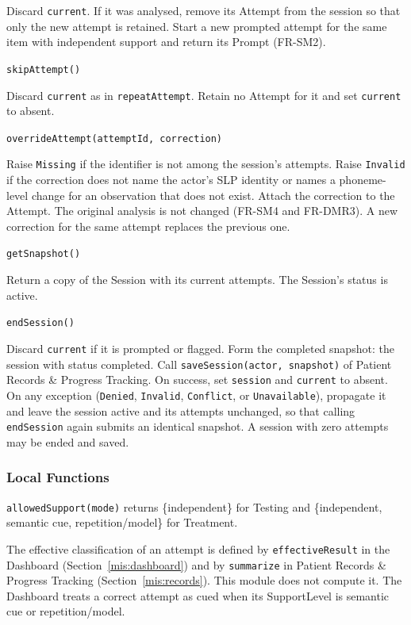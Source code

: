 \documentclass[12pt, titlepage]{article}
\begin{document}
\begin{description}
Discard \texttt{current}. If it was analysed, remove its Attempt from the
session so that only the new attempt is retained. Start a new prompted attempt
for the same item with independent support and return its Prompt (FR-SM2).
\item[] \texttt{skipAttempt()}\par
Discard \texttt{current} as in \texttt{repeatAttempt}. Retain no Attempt for it
and set \texttt{current} to absent.
\item[] \texttt{overrideAttempt(attemptId, correction)}\par
Raise \texttt{Missing} if the identifier is not among the session's attempts.
Raise \texttt{Invalid} if the correction does not name the actor's SLP identity
or names a phoneme-level change for an observation that does not exist.
Attach the correction to the Attempt. The original analysis is not changed
(FR-SM4 and FR-DMR3). A new correction for the same attempt replaces the
previous one.
\item[] \texttt{getSnapshot()}\par
Return a copy of the Session with its current attempts. The Session's status is
active.
\item[] \texttt{endSession()}\par
Discard \texttt{current} if it is prompted or flagged. Form the completed
snapshot: the session with status completed. Call
\texttt{saveSession(actor, snapshot)} of Patient Records \& Progress Tracking.
On success, set \texttt{session} and \texttt{current} to absent. On any
exception (\texttt{Denied}, \texttt{Invalid}, \texttt{Conflict}, or
\texttt{Unavailable}), propagate it and leave the session active and its
attempts unchanged, so that calling \texttt{endSession} again submits an
identical snapshot. A session with zero attempts may be ended and saved.
\end{description}

\subsubsection{Local Functions}
\texttt{allowedSupport(mode)} returns \{independent\} for Testing and
\{independent, semantic cue, repetition/model\} for Treatment.

\noindent The effective classification of an attempt is defined by
\texttt{effectiveResult} in the Dashboard (Section~\ref{mis:dashboard}) and by
\texttt{summarize} in Patient Records \& Progress Tracking
(Section~\ref{mis:records}). This module does not compute it. The Dashboard
treats a correct attempt as cued when its SupportLevel is semantic cue or
repetition/model.
\end{document}

